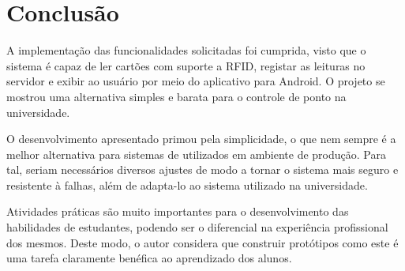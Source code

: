 \chapter{Conclusão}
\label{conclusao}

A implementação das funcionalidades solicitadas foi cumprida, visto que o sistema é capaz de ler cartões com suporte a RFID, registar as leituras no servidor e exibir ao usuário por meio do aplicativo para Android. O projeto se mostrou uma alternativa simples e barata para o controle de ponto na universidade.

O desenvolvimento apresentado primou pela simplicidade, o que nem sempre é a melhor alternativa para sistemas de utilizados em ambiente de produção. Para tal, seriam necessários diversos ajustes de modo a tornar o sistema mais seguro e resistente à falhas, além de adapta-lo ao sistema utilizado na universidade.

Atividades práticas são muito importantes para o desenvolvimento das habilidades de estudantes, podendo ser o diferencial na experiência profissional dos mesmos. Deste modo, o autor considera que construir protótipos como este é uma tarefa claramente benéfica ao aprendizado dos alunos.